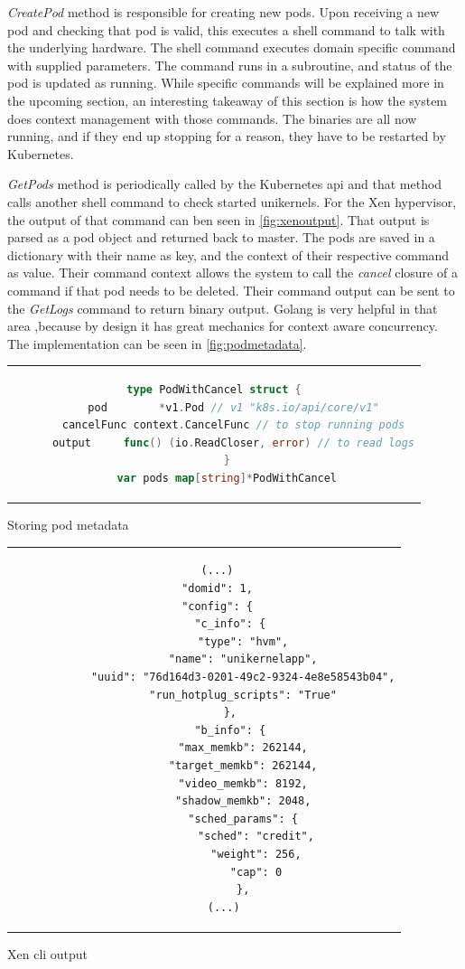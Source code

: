 \textit{CreatePod} method is responsible for creating new pods. Upon receiving a new pod and checking that pod is valid, this  executes a shell command to talk with the underlying hardware. The shell command executes domain specific command with supplied parameters. The command runs in a subroutine, and status of the pod is updated as running. While specific commands will be explained more in the upcoming section, an interesting takeaway of this section is how the system does context management with those commands. The binaries are all now running, and if they end up stopping for a reason, they have to be restarted by Kubernetes.

\textit{GetPods} method is periodically called by the Kubernetes api and that method calls another shell command to check started unikernels. For the Xen hypervisor, the output of that command can ben seen in \ref{fig:xenoutput}. That output is parsed as a pod object and returned back to master. The pods are saved in a dictionary with their name as key, and the context of their respective command as value. Their command context allows the system to call the \textit{cancel} closure of a command if that pod needs to be deleted. Their command output can be sent to the \textit{GetLogs} command to return binary output. Golang is very helpful in that area ,because by design it has great mechanics for context aware concurrency. The implementation can be seen in \ref{fig:podmetadata}.
\begin{code}[htpb]
  \centering
  \begin{tabular}{c}
  \begin{lstlisting}[language=go]
    type PodWithCancel struct {
      pod        *v1.Pod // v1 "k8s.io/api/core/v1"
      cancelFunc context.CancelFunc // to stop running pods
      output     func() (io.ReadCloser, error) // to read logs
    }
    var pods map[string]*PodWithCancel
\end{lstlisting}
\end{tabular}
\caption{Storing pod metadata}\label{fig:podmetadata}
\end{code}

\begin{code}[!h]
  \centering
  \begin{tabular}{c}
  \begin{lstlisting}
    (...)
    "domid": 1,
    "config": {
        "c_info": {
            "type": "hvm",
            "name": "unikernelapp",
            "uuid": "76d164d3-0201-49c2-9324-4e8e58543b04",
            "run_hotplug_scripts": "True"
        },
        "b_info": {
            "max_memkb": 262144,
            "target_memkb": 262144,
            "video_memkb": 8192,
            "shadow_memkb": 2048,
            "sched_params": {
                "sched": "credit",
                "weight": 256,
                "cap": 0
            },
      (...)
\end{lstlisting}
\end{tabular}
\caption{Xen cli output}\label{fig:xenoutput}
\end{code}



